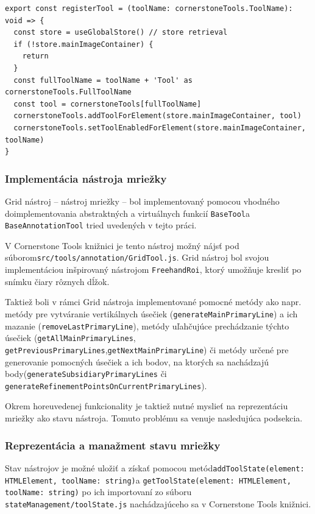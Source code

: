\begin{minipage}[]{\linewidth}
\begin{verbatim}
export const registerTool = (toolName: cornerstoneTools.ToolName): void => {
  const store = useGlobalStore() // store retrieval
  if (!store.mainImageContainer) {
    return
  }
  const fullToolName = toolName + 'Tool' as cornerstoneTools.FullToolName
  const tool = cornerstoneTools[fullToolName]
  cornerstoneTools.addToolForElement(store.mainImageContainer, tool)
  cornerstoneTools.setToolEnabledForElement(store.mainImageContainer, toolName)
}
\end{verbatim}
\end{minipage}

\subsubsection {Implementácia nástroja mriežky}
Grid nástroj -- nástroj mriežky -- bol implementovaný pomocou vhodného doimplementovania abstraktných a virtuálnych funkcií \texttt{BaseTool}\newline a \texttt{BaseAnnotationTool} tried uvedených v tejto práci.

V Cornerstone Tools knižnici je tento nástroj možný nájsť pod súborom\newline \texttt{src/tools/annotation/GridTool.js}. Grid nástroj bol svojou implementáciou inšpirovaný nástrojom \texttt{FreehandRoi}, ktorý umožňuje kresliť po snímku čiary rôznych dĺžok.

Taktiež boli v rámci Grid nástroja implementované pomocné metódy ako napr. metódy pre vytváranie vertikálnych úsečiek (\texttt{generateMainPrimaryLine}) a ich mazanie (\texttt{removeLastPrimaryLine}), metódy uľahčujúce prechádzanie týchto úsečiek (\texttt{getAllMainPrimaryLines}, \texttt{getPreviousPrimaryLines},\newline \texttt{getNextMainPrimaryLine}) či metódy určené pre generovanie pomocných úsečiek a ich bodov, na ktorých sa nachádzajú  body\newline (\texttt{generateSubsidiaryPrimaryLines} či \newline \texttt{generateRefinementPointsOnCurrentPrimaryLines}).

Okrem horeuvedenej funkcionality je taktiež nutné myslieť na reprezentáciu mriežky ako stavu nástroja. Tomuto problému sa venuje nasledujúca podsekcia.

\subsubsection* {Reprezentácia a manažment stavu mriežky}
Stav nástrojov je možné uložiť a získať pomocou metód\newline \texttt{addToolState(element: HTMLElement, toolName: string)}\newline a \texttt{getToolState(element: HTMLElement, toolName: string)} po ich importovaní zo súboru \texttt{stateManagement/toolState.js} nachádzajúceho sa v Cornerstone Tools knižnici.

